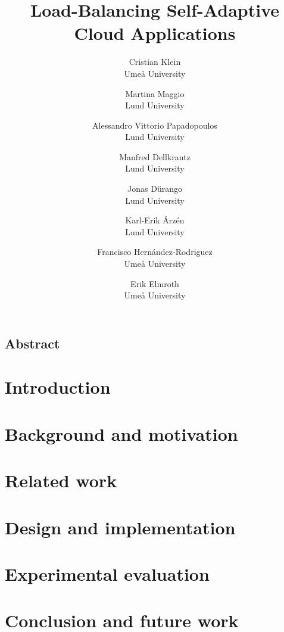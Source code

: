 \documentclass[letterpaper,twocolumn,10pt]{article}
\begin{document}
\date{}
\title{\Large \bf Load-Balancing Self-Adaptive Cloud Applications}

\author{
{\rm Cristian Klein}\\
Ume{\aa} University
\and
{\rm Martina Maggio}\\
Lund University
\and
{\rm Alessandro Vittorio Papadopoulos}\\
Lund University
\and
{\rm Manfred Dellkrantz}\\
Lund University
\and
{\rm Jonas D{\"u}rango}\\
Lund University
\and
{\rm Karl-Erik {\AA}rz\'en}\\
Lund University
\and
{\rm Francisco Hern{\'a}ndez-Rodriguez}\\
Ume{\aa} University
\and
{\rm Erik Elmroth}\\
Ume{\aa} University
} %

\maketitle



\subsection*{Abstract}


\section{Introduction}
\label{sec:Introduction}


\section{Background and motivation}
\label{sec:ProblemStatement}


\section{Related work}
\label{sec:Related}


\section{Design and implementation}
\label{sec:Solution}


\section{Experimental evaluation}
\label{sec:Results}


\section{Conclusion and future work}
\label{sec:Conclusion}


\printbibliography
\end{document}
